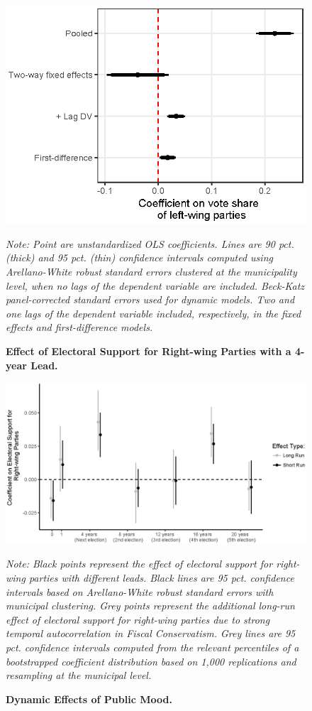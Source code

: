 \documentclass[a4paper,11pt]{article}
\newcommand\fnote[1]{\captionsetup{font=small}\caption*{#1}}
\begin{document}
\begin{figure}[h]
	\centering
	\includegraphics[scale = 1.1]{ggplot_coef_inflation_adjusted.eps}
	\caption{\textbf{Effect of Electoral Support for Right-wing Parties with a 4-year Lead.}} \fnote{\emph{Note: Point are unstandardized OLS coefficients. Lines are 90 pct. (thick) and 95 pct. (thin) confidence intervals computed using Arellano-White robust standard errors clustered at the municipality level, when no lags of the dependent variable are included. Beck-Katz panel-corrected standard errors used for dynamic models. Two and one lags of the dependent variable included, respectively, in the fixed effects and first-difference models.}}
	\label{fig:FourYearLead}
\end{figure}


\begin{figure}[h]
	\centering
	\includegraphics[scale = .8]{coef_on_varying_leads.eps}
	\caption{\textbf{Dynamic Effects of Public Mood.}} \fnote{\emph{Note: Black points represent the effect of electoral support for right-wing parties with different leads. Black lines are 95 pct. confidence intervals based on Arellano-White robust standard errors with municipal clustering. Grey points represent the additional long-run effect of electoral support for right-wing parties due to strong temporal autocorrelation in Fiscal Conservatism. Grey lines are 95 pct. confidence intervals computed from the relevant percentiles of a bootstrapped coefficient distribution based on 1,000 replications and resampling at the municipal level.}}
	\label{fig:LongRun}
\end{figure}
\end{document}
